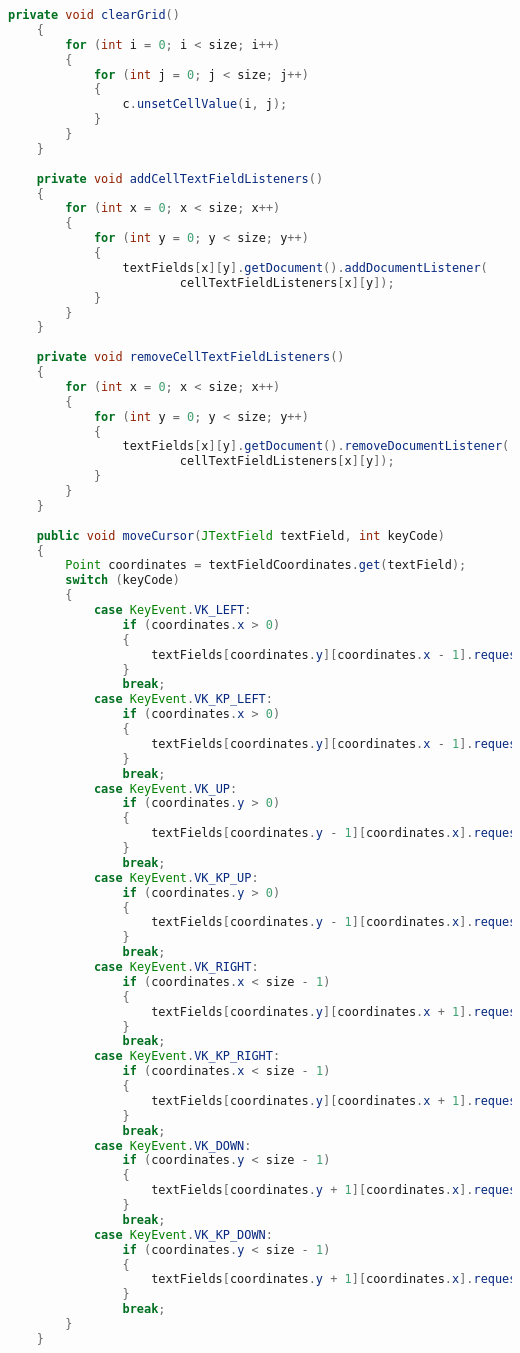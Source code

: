 \begin{lstlisting}[language=Java,basicstyle=\tiny,caption=GUI.java]
    private void clearGrid()
    {
        for (int i = 0; i < size; i++)
        {
            for (int j = 0; j < size; j++)
            {
                c.unsetCellValue(i, j);
            }
        }
    }
    
    private void addCellTextFieldListeners()
    {
        for (int x = 0; x < size; x++)
        {
            for (int y = 0; y < size; y++)
            {
                textFields[x][y].getDocument().addDocumentListener(
                        cellTextFieldListeners[x][y]);
            }
        }
    }
    
    private void removeCellTextFieldListeners()
    {
        for (int x = 0; x < size; x++)
        {
            for (int y = 0; y < size; y++)
            {
                textFields[x][y].getDocument().removeDocumentListener(
                        cellTextFieldListeners[x][y]);
            }
        }
    }
    
    public void moveCursor(JTextField textField, int keyCode)
    {
        Point coordinates = textFieldCoordinates.get(textField);
        switch (keyCode)
        {
            case KeyEvent.VK_LEFT:
                if (coordinates.x > 0)
                {
                    textFields[coordinates.y][coordinates.x - 1].requestFocus();
                }
                break;
            case KeyEvent.VK_KP_LEFT:
                if (coordinates.x > 0)
                {
                    textFields[coordinates.y][coordinates.x - 1].requestFocus();
                }
                break;
            case KeyEvent.VK_UP:
                if (coordinates.y > 0)
                {
                    textFields[coordinates.y - 1][coordinates.x].requestFocus();
                }
                break;
            case KeyEvent.VK_KP_UP:
                if (coordinates.y > 0)
                {
                    textFields[coordinates.y - 1][coordinates.x].requestFocus();
                }
                break;
            case KeyEvent.VK_RIGHT:
                if (coordinates.x < size - 1)
                {
                    textFields[coordinates.y][coordinates.x + 1].requestFocus();
                }
                break;
            case KeyEvent.VK_KP_RIGHT:
                if (coordinates.x < size - 1)
                {
                    textFields[coordinates.y][coordinates.x + 1].requestFocus();
                }
                break;
            case KeyEvent.VK_DOWN:
                if (coordinates.y < size - 1)
                {
                    textFields[coordinates.y + 1][coordinates.x].requestFocus();
                }
                break;
            case KeyEvent.VK_KP_DOWN:
                if (coordinates.y < size - 1)
                {
                    textFields[coordinates.y + 1][coordinates.x].requestFocus();
                }
                break;
        }
    }
    

\end{lstlisting}
